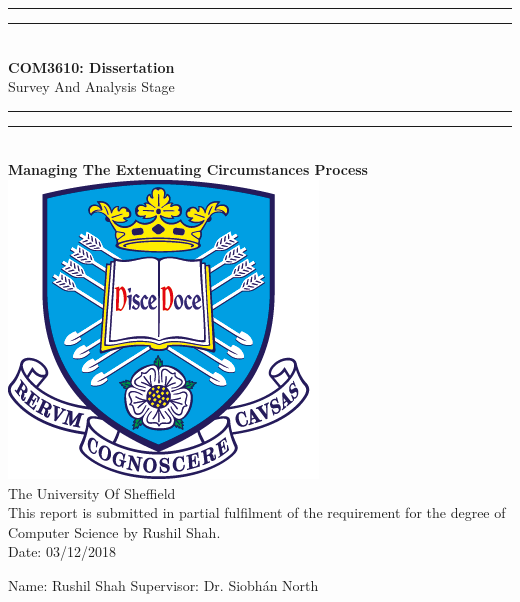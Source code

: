 \documentclass[../main.tex]{subfiles}
\begin{document}
\begin{center}
\rule[0.5ex]{\linewidth}{2pt}\vspace*{-\baselineskip}\vspace*{3.2pt}
\rule[0.5ex]{\linewidth}{1pt}\\[\baselineskip]

\textbf{ {\LARGE COM3610: Dissertation}}\\[2mm]
{\Large Survey And Analysis Stage}\\[4mm]

\rule[0.5ex]{\linewidth}{1pt}\vspace*{-\baselineskip}\vspace{3.2pt}
\rule[0.5ex]{\linewidth}{2pt}\\[4mm]

\textbf{{\large Managing The Extenuating Circumstances Process}}\\[20mm]


\includegraphics[scale=2]{images/TuosLogo.png}\\[8mm]

{\LARGE The University Of Sheffield}\\[2mm]
This report is submitted in partial fulfilment of the requirement for the degree of Computer Science by Rushil Shah.\\[2mm]

Date: 03/12/2018\\[20mm]

\end{center}

\begin{large}
Name: Rushil Shah 
\hfill
Supervisor: Dr. Siobhán North
\end{large}


%
%
%
\end{document}
